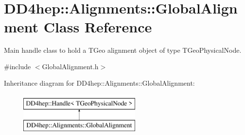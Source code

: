 \hypertarget{class_d_d4hep_1_1_alignments_1_1_global_alignment}{}\section{D\+D4hep\+:\+:Alignments\+:\+:Global\+Alignment Class Reference}
\label{class_d_d4hep_1_1_alignments_1_1_global_alignment}


Main handle class to hold a T\+Geo alignment object of type T\+Geo\+Physical\+Node.  




{\ttfamily \#include $<$Global\+Alignment.\+h$>$}

Inheritance diagram for D\+D4hep\+:\+:Alignments\+:\+:Global\+Alignment\+:\begin{figure}[H]
\begin{center}
\leavevmode
\includegraphics[height=2.000000cm]{class_d_d4hep_1_1_alignments_1_1_global_alignment}
\end{center}
\end{figure}
